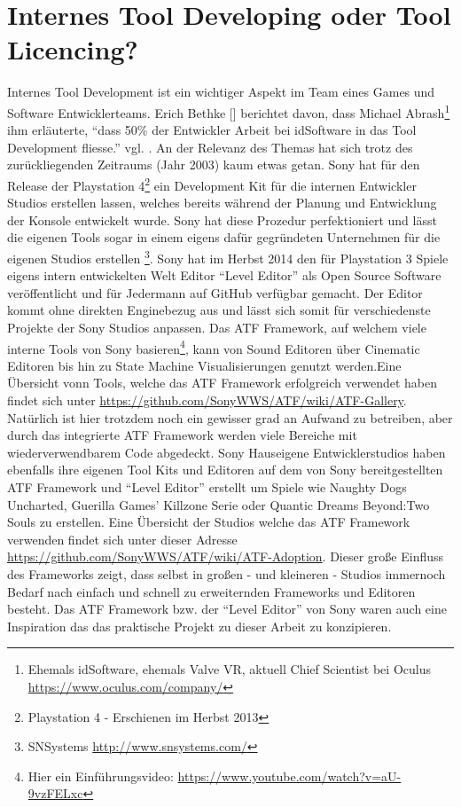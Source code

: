 \documentclass[pagesize, paper=a4, fontsize=12pt, titlepage=true, headings=small, headnosepline, abstractoff, liststotoc, nochapterprefix, plainheadsepline, twoside]{scrreprt}
\begin{document}
\section{Internes Tool Developing oder Tool Licencing?}
Internes Tool Development ist ein wichtiger Aspekt im Team eines Games und Software Entwicklerteams. Erich Bethke [] berichtet davon, dass Michael Abrash\footnote{Ehemals idSoftware, ehemals Valve VR, aktuell Chief Scientist bei Oculus \url{https://www.oculus.com/company/}} ihm erläuterte, “dass 50\% der Entwickler Arbeit bei idSoftware in das Tool Development fliesse.” vgl. \cite[S. 44]{Bethke2003}. An der Relevanz des Themas hat sich trotz des zurückliegenden Zeitraums (Jahr 2003) kaum etwas getan. Sony hat für den Release der Playstation 4\footnote{Playstation 4 - Erschienen im Herbst 2013} ein Development Kit  für die internen Entwickler Studios  erstellen lassen, welches bereits während der Planung und Entwicklung der Konsole entwickelt wurde. Sony hat diese Prozedur perfektioniert und lässt die eigenen Tools sogar in einem eigens dafür gegründeten Unternehmen für die eigenen Studios erstellen \footnote{SNSystems \url{http://www.snsystems.com/}}. Sony hat im Herbst 2014 den für Playstation 3 Spiele eigens intern entwickelten Welt Editor “Level Editor” als Open Source Software veröffentlicht und für Jedermann auf GitHub verfügbar gemacht. Der Editor kommt ohne direkten Enginebezug aus und lässt sich somit für verschiedenste Projekte der Sony Studios anpassen. Das ATF Framework, auf welchem viele interne Tools von Sony basieren\footnote{Hier ein Einführungsvideo: \url{https://www.youtube.com/watch?v=aU-9vzFELxc}}, kann von Sound Editoren über Cinematic Editoren bis hin zu State Machine Visualisierungen genutzt werden.Eine Übersicht vonn Tools, welche das ATF Framework erfolgreich verwendet haben findet sich unter \url{https://github.com/SonyWWS/ATF/wiki/ATF-Gallery}. Natürlich ist hier trotzdem noch ein gewisser grad an Aufwand zu betreiben, aber durch das integrierte ATF Framework werden viele Bereiche mit wiederverwendbarem Code abgedeckt. Sony Hauseigene  Entwicklerstudios haben ebenfalls ihre eigenen Tool Kits und Editoren auf dem von Sony bereitgestellten ATF Framework und “Level Editor” erstellt um Spiele wie Naughty Dogs Uncharted, Guerilla Games’ Killzone Serie oder Quantic Dreams Beyond:Two Souls zu erstellen. Eine Übersicht der Studios welche das ATF Framework verwenden findet sich unter dieser Adresse \url{https://github.com/SonyWWS/ATF/wiki/ATF-Adoption}. Dieser große Einfluss des Frameworks zeigt, dass selbst in großen - und kleineren - Studios immernoch Bedarf nach einfach und schnell zu erweiternden Frameworks und Editoren besteht. Das ATF Framework bzw. der “Level Editor” von Sony waren auch eine Inspiration das das praktische Projekt zu dieser Arbeit zu konzipieren.
\end{document}
